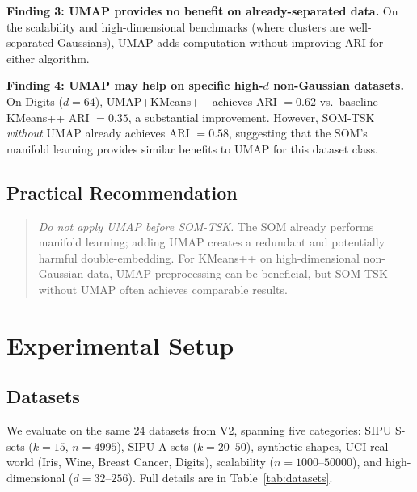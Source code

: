 \documentclass[journal]{IEEEtran}
\begin{document}
\textbf{Finding 3: UMAP provides no benefit on already-separated data.} On the scalability and high-dimensional benchmarks (where clusters are well-separated Gaussians), UMAP adds computation without improving ARI for either algorithm.

\textbf{Finding 4: UMAP may help on specific high-$d$ non-Gaussian datasets.} On Digits ($d=64$), UMAP+KMeans++ achieves ARI $= 0.62$ vs.\ baseline KMeans++ ARI $= 0.35$, a substantial improvement. However, SOM-TSK \emph{without} UMAP already achieves ARI $= 0.58$, suggesting that the SOM's manifold learning provides similar benefits to UMAP for this dataset class.

\subsection{Practical Recommendation}

\begin{quote}
\textit{Do not apply UMAP before SOM-TSK.} The SOM already performs manifold learning; adding UMAP creates a redundant and potentially harmful double-embedding. For KMeans++ on high-dimensional non-Gaussian data, UMAP preprocessing can be beneficial, but SOM-TSK without UMAP often achieves comparable results.
\end{quote}

\section{Experimental Setup}
\label{sec:experiments}

\subsection{Datasets}

We evaluate on the same 24 datasets from V2, spanning five categories: SIPU S-sets ($k=15$, $n=4995$), SIPU A-sets ($k=20$--$50$), synthetic shapes, UCI real-world (Iris, Wine, Breast Cancer, Digits), scalability ($n=1000$--$50000$), and high-dimensional ($d=32$--$256$). Full details are in Table~\ref{tab:datasets}.
\end{document}
